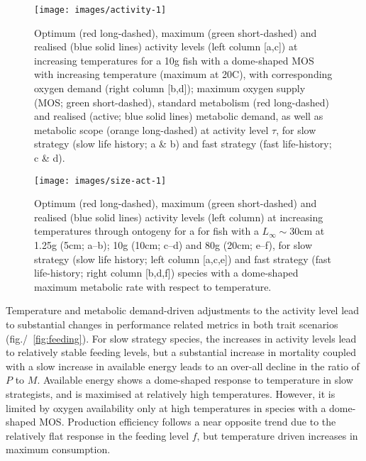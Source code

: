 \documentclass[11pt]{article}\usepackage[]{graphicx}\usepackage[]{color}
\makeatletter
\def\maxwidth{ %
  \ifdim\Gin@nat@width>\linewidth
    \linewidth
  \else
    \Gin@nat@width
  \fi
}
\makeatother
\begin{document}
\begin{figure}
\centering

\texttt{[image: images/activity-1]} 

\caption{Optimum (red long-dashed), maximum (green short-dashed) and realised (blue solid lines) activity levels (left column [a,c]) at increasing temperatures for a 10g fish with a dome-shaped MOS with increasing temperature (maximum at 20\degree C), with corresponding oxygen demand (right column [b,d]); maximum oxygen supply (MOS; green short-dashed), standard metabolism (red long-dashed) and realised (active; blue solid lines) metabolic demand, as well as metabolic scope (orange long-dashed) at activity level $\tau$, for slow strategy (slow life history; a \& b) and fast strategy (fast life-history; c \& d).}
\label{fig:activity}
\end{figure}



\begin{figure}

{\centering \texttt{[image: images/size-act-1]} 

}

\caption[Optimum (red long-dashed), maximum (green short-dashed) and realised (blue solid lines) activity levels (left column) at increasing temperatures through ontogeny for a for fish with a $L_{\infty}\sim 30$cm at 1.25g (5cm]{Optimum (red long-dashed), maximum (green short-dashed) and realised (blue solid lines) activity levels (left column) at increasing temperatures through ontogeny for a for fish with a $L_{\infty}\sim 30$cm at 1.25g (5cm; a--b); 10g (10cm; c--d) and 80g (20cm; e--f), for slow strategy (slow life history; left column [a,c,e]) and fast strategy (fast life-history; right column [b,d,f]) species with a dome-shaped maximum metabolic rate with respect to temperature.}\label{fig:size-act}
\end{figure}



Temperature and metabolic demand-driven adjustments to the activity level lead to substantial changes in performance related metrics in both trait scenarios (fig./~\ref{fig:feeding}). For slow strategy species, the increases in activity levels lead to relatively stable feeding levels, but a substantial increase in mortality coupled with a slow increase in available energy leads to an over-all decline in the ratio of $P$ to $M$. Available energy shows a dome-shaped response to temperature in slow strategists, and is maximised at relatively high temperatures. However, it is limited by oxygen availability only at high temperatures in species with a dome-shaped MOS. Production efficiency follows a near opposite trend due to the relatively flat response in the feeding level $f$, but temperature driven increases in maximum consumption.
\end{document}
